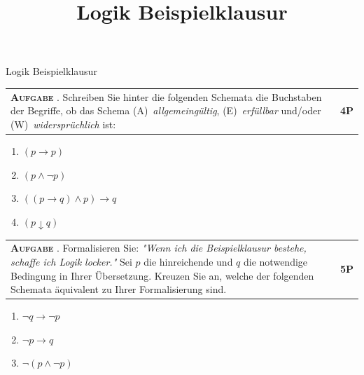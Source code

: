 \documentclass[a4paper,12pt]{article}
\title{Logik Beispielklausur}
\date{\thedate}
\makeatletter
\newcounter{ctasks}
\newcounter{cpoints}
\newcounter{ehtmppoints}
\newcounter{ehtpointsline}
\newcommand{\eh}[1]{{\bigskip\setcounter{ehtmppoints}{0}\footnotesize\iftoggle{NOTDEBUG}{}{\noindent\begin{tcolorbox}[size=title,right=1cm,enhanced,breakable,title=Erwartungshorizont Aufgabe \thectasks]
\everypar={\setcounter{ehtpointsline}{0}}

\noindent#1

\bigskip\noindent \textbf{Erreichbare Punkte: \theehtmppoints}
\smallskip\noindent\end{tcolorbox}}\normalsize}}
\newcommand*{\point}{\stepcounter{ehtmppoints}\marginnote{\advance\leftskip-1.2cm\ensuremath{\bigstar}}}
\newcommand{\task}[4]{\stepcounter{ctasks}\bigskip\noindent
\begin{tabular}{@{}p{14.2cm} >{\raggedleft\arraybackslash}p{1cm}@{}}
  \begin{minipage}[t]{14.2cm}
    \textbf{\textsc{#4 \thectasks}}. #1
  \end{minipage}
  & \textbf{#2P}
\end{tabular}
\nopagebreak
#3}
\newcommand{\newtask}[3]{\addtocounter{cpoints}{#2}\task{#1}{#2}{#3}{Aufgabe}}
\newcommand{\printlines}[1]{\normalsize\iftoggle{NOTDEBUG}{\begin{flushleft}\begin{longtable}[t]{@{}p{15.8cm}@{}}\directlua{
        for i=0,#1 do
            tex.print("\\medskip \\\\ \\hline")
        end
    }\end{longtable}\end{flushleft}}{}\normalsize}
\makeatother
\begin{document}
\begin{center}
    \Large Logik Beispielklausur
\end{center}

\newtask{Schreiben Sie hinter die folgenden Schemata die Buchstaben der Begriffe, ob das Schema \mbox{(A) \textit{allgemeingültig}}, \mbox{(E) \textit{erfüllbar}} und/oder \mbox{(W) \textit{widersprüchlich}} ist:}{4}{

\begin{enumerate}[label=\arabic*.,align=right]
    \item $(p \rightarrow p)$
    \item $(p \wedge \lnot p)$
    \item $((p \rightarrow q) \wedge p) \rightarrow q$
    \item $(p \downarrow q)$
\end{enumerate}

\eh{\begin{enumerate}[label=\arabic*.,align=right]
    \item \point (A), (E)
    \item \point (W)
    \item \point (A), (E)
    \item \point (E)
\end{enumerate}}
}

\newtask{Formalisieren Sie: \textit{"Wenn ich die Beispielklausur bestehe, schaffe ich Logik locker."}  Sei $p$ die hinreichende und $q$ die notwendige Bedingung in Ihrer Übersetzung. Kreuzen Sie an, welche der folgenden Schemata äquivalent zu Ihrer Formalisierung sind.}{5}{

\begin{enumerate}[align=center,label={$\bigcirc$}]
    \item $\lnot q \rightarrow \lnot p$
    \item $\lnot p \rightarrow q$
    \item $\lnot (p \wedge \lnot p)$
\end{enumerate}

\printlines{5}

\eh{Mögliche Formalisierung:

\bigskip\point p := "Ich bestehe die Beispielklausur."

q := "Ich schaffe Logik locker."

\point $p \rightarrow q$

\bigskip
Je nach Formalisierung entweder nichts oder ...

\begin{enumerate}[align=center,label={$\bigcirc$}]
    \item[\otimes] \point $\lnot q \rightarrow \lnot p$
    \item \point $\lnot p \rightarrow q$
    \item[\otimes] \point $\lnot (p \wedge \lnot p)$
\end{enumerate}}
}
\end{document}
